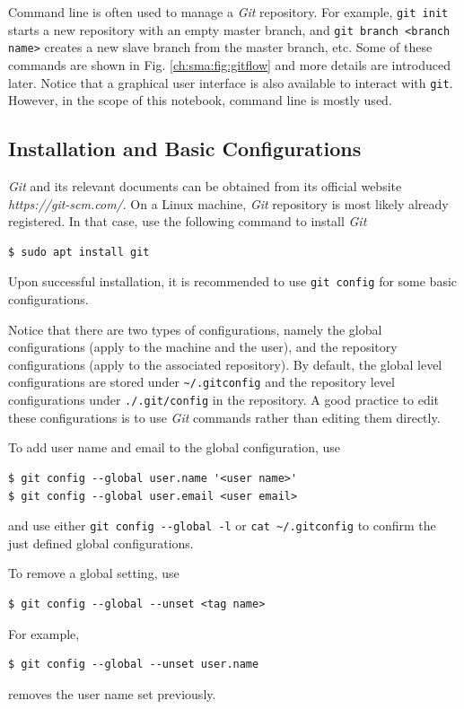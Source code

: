 Command line is often used to manage a \textit{Git} repository. For example, \verb|git init| starts a new repository with an empty master branch, and \verb|git branch <branch name>| creates a new slave branch from the master branch, etc. Some of these commands are shown in Fig. \ref{ch:sma:fig:gitflow} and more details are introduced later. Notice that a graphical user interface is also available to interact with \verb|git|. However, in the scope of this notebook, command line is mostly used.

\subsection{Installation and Basic Configurations}

\textit{Git} and its relevant documents can be obtained from its official website  \textit{https://git-scm.com/}. On a Linux machine, \textit{Git} repository is most likely already registered. In that case, use the following command to install \textit{Git}
\begin{lstlisting}
$ sudo apt install git
\end{lstlisting}

Upon successful installation, it is recommended to use \verb|git config| for some basic configurations.

Notice that there are two types of configurations, namely the global configurations (apply to the machine and the user), and the repository configurations (apply to the associated repository). By default, the global level configurations are stored under \verb|~/.gitconfig| and the repository level configurations under \verb|./.git/config| in the repository. A good practice to edit these configurations is to use \textit{Git} commands rather than editing them directly.

To add user name and email to the global configuration, use
\begin{lstlisting}
$ git config --global user.name '<user name>'
$ git config --global user.email <user email>
\end{lstlisting}
and use either \verb|git config --global -l| or \verb|cat ~/.gitconfig| to confirm the just defined global configurations.

To remove a global setting, use
\begin{lstlisting}
$ git config --global --unset <tag name>
\end{lstlisting}
For example,
\begin{lstlisting}
$ git config --global --unset user.name
\end{lstlisting}
removes the user name set previously.

